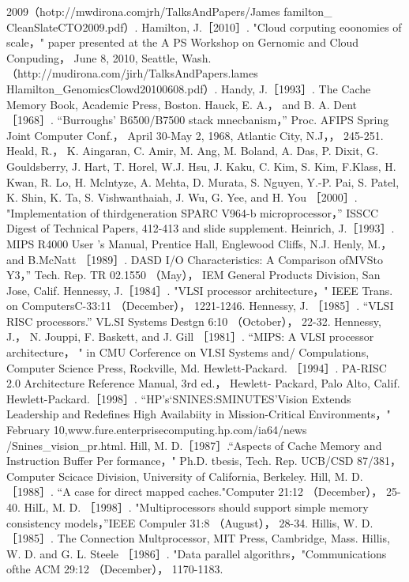 2009（hotp://mwdirona.comjrh/TalksAndPapers/James familton_ CleanSlateCTO2009.pdf）.
Hamilton, J.［2010］. "Cloud corputing eoonomies of scale，" paper presented at the A PS Workshop on Gernomic and Cloud Conpuding，
June 8, 2010, Seattle, Wash. （http://mudirona.com/jirh/TalksAndPapers.lames Hlamilton_GenomicsClowd20100608.pdf）.
Handy, J.［1993］. The Cache Memory Book, Academic Press, Boston.
Hauck, E. A.， and B. A. Dent ［1968］. “Burroughs' B6500/B7500 stack mnecbanism，” Proc. AFIPS Spring Joint Computer Conf.，
April 30-May 2, 1968, Atlantic City, N.J，， 245-251.
Heald, R.， K. Aingaran, C. Amir, M. Ang, M. Boland, A. Das, P. Dixit, G. Gouldsberry, J. Hart, T. Horel, W.J. Hsu, J. Kaku, C.
Kim, S. Kim, F.Klass, H. Kwan, R. Lo, H. Mclntyze, A. Mehta, D. Murata, S. Nguyen, Y.-P. Pai, S. Patel, K. Shin, K. Ta, S.
Vishwanthaiah, J. Wu, G. Yee, and H. You ［2000］. "Implementation of thirdgeneration SPARC V964-b microprocessor，”
ISSCC Digest of Technical Papers, 412-413 and slide supplement.
Heinrich, J.［1993］. MIPS R4000 User 's Manual, Prentice Hall, Englewood Cliffs, N.J.
Henly, M.，and B.McNatt ［1989］. DASD I/O Characteristics: A Comparison ofMVSto Y3，” Tech. Rep. TR 02.1550 （May）， IEM
General Products Division, San Jose, Calif.
Hennessy, J.［1984］. "VLSI processor architecture，" IEEE Trans. on ComputersC-33:11 （December）， 1221-1246.
Hennessy, J. ［1985］. “VLSI RISC processors.” VL.SI Systems Destgn 6:10 （October）， 22-32.
Hennessy, J.， N. Jouppi, F. Baskett, and J. Gill ［1981］. “MIPS: A VLSI processor architecture， " in CMU Corference on VI.SI
Systems and/ Compulations, Computer Science Press, Rockville, Md.
Hewlett-Packard. ［1994］. PA-RISC 2.0 Architecture Reference Manual, 3rd ed.， Hewlett- Packard, Palo Alto, Calif.
Hewlett-Packard.［1998］. “HP's‘SNINES:SMINUTES’Vision Extends Leadership and Redefines High Availabiity in
Mission-Critical Environments，" February 10,www.fure.enterprisecomputing.hp.com/ia64/news /Snines_vision_pr.html.
Hill, M. D.［1987］.“Aspects of Cache Memory and Instruction Buffer Per formance，" Ph.D. tbesis, Tech. Rep. UCB/CSD 87/381，
Computer Scicace Division, University of California, Berkeley.
Hill, M. D.［1988］. “A case for direct mapped caches."Computer 21:12 （December）， 25-40.
HilL, M. D. ［1998］. "Multiprocessors should support simple memory consistency models，”IEEE Compuler 31:8 （August）， 28-34.
Hillis, W. D.［1985］. The Connection Multprocessor, MIT Press, Cambridge, Mass.
Hillis, W. D. and G. L. Steele ［1986］. "Data parallel algorithrs，"Communications ofthe ACM 29:12 （December）， 1170-1183.
